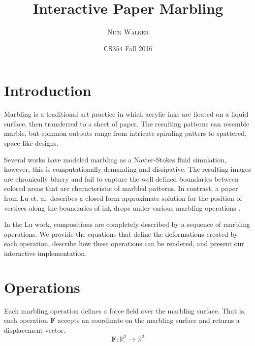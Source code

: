 \documentclass{article}
\title{Interactive Paper Marbling}
\author{\textsc{Nick Walker}}
\date{CS354 Fall 2016} %
\newcommand{\Fb}{\boldsymbol{F}}
\begin{document}
\twocolumn	
\maketitle %


\section{Introduction}

Marbling is a traditional art practice in which acrylic inks are floated on a liquid surface, then transferred to a sheet of paper. The resulting patterns can resemble marble, but common outputs range from intricate spiraling patters to spattered, space-like designs.

Several works have modeled marbling as a Navier-Stokes fluid simulation, however, this is computationally demanding and dissipative. The resulting images are chronically blurry and fail to capture the well defined boundaries between colored areas that are characteristic of marbled patterns. In contrast, a paper from Lu et. al. describes a closed form approximate solution for the position of vertices along the boundaries of ink
drops under various marbling operations \cite{Shufang2012}.
 
In the Lu work, compositions are completely described by a sequence of marbling operations. We provide the equations that define the deformations created by each operation, describe how these operations can be rendered, and present our interactive implementation.



\section{Operations}

Each marbling operation defines a force field over the marbling surface. That is, each operation $\Fb$ accepts an coordinate on the marbling surface and returns a displacement vector.
\begin{equation*}
		\Fb: \mathbb{R}^2 \rightarrow \mathbb{R}^2
\end{equation*}
\end{document}
